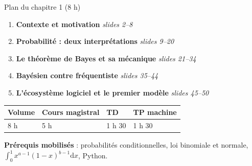 \begin{frame}{Plan du chapitre 1 (8 h)}
\begin{enumerate}
  \item[1.1] \textbf{Contexte et motivation} \hfill \textit{slides 2--8}
  \item[1.2] \textbf{Probabilité : deux interprétations} \hfill \textit{slides 9--20}
  \item[1.3] \textbf{Le théorème de Bayes et sa mécanique} \hfill \textit{slides 21--34}
  \item[1.4] \textbf{Bayésien contre fréquentiste} \hfill \textit{slides 35--44}
  \item[1.5] \textbf{L'écosystème logiciel et le premier modèle} \hfill \textit{slides 45--50}
\end{enumerate}
\vspace{3mm}
\begin{tabular}{@{}llll@{}}
\toprule
\textbf{Volume} & \textbf{Cours magistral} & \textbf{TD} & \textbf{TP machine} \\
\midrule
8 h & 5 h & 1 h 30 & 1 h 30 \\
\bottomrule
\end{tabular}
\vspace{2mm}
\begin{tcolorbox}[colback=byPurple!6,colframe=byPurple,arc=2mm,width=.95\textwidth]
\small\centering
\textbf{Prérequis mobilisés} : probabilités conditionnelles, loi binomiale et normale,
$\int_0^1 x^{a-1}(1-x)^{b-1}\mathrm{d}x$, Python.
\end{tcolorbox}
\end{frame}

